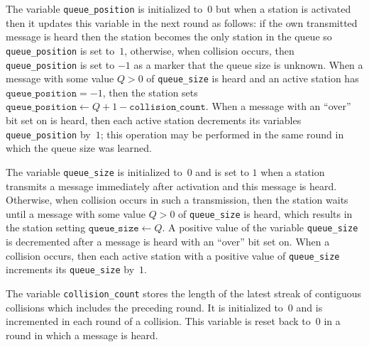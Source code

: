 \documentclass[11pt]{article}
\begin{document}
The variable \texttt{queue\_position} is initialized to~$0$ but when a station is activated then it updates this variable in the next round as follows: if the own transmitted message is heard then the station becomes the only station in the queue so \texttt{queue\_position} is set to~$1$, otherwise, when collision occurs, then \texttt{queue\_position} is set to $-1$ as a marker that the queue size is unknown.
When a message with some value $Q>0$ of \texttt{queue\_size} is heard and an active station has $\texttt{queue\_position}=-1$, then the station sets   $\texttt{queue\_position}\gets Q+1 -\texttt{collision\_count}$.
When a message with an ``over'' bit set on is heard, then each active station decrements its variables \texttt{queue\_position}  by~$1$; this operation may be performed in the same round in which the queue size was learned.


The variable \texttt{queue\_size} is initialized to~$0$ and is set to $1$ when a station transmits a message immediately after activation and this message is heard.
Otherwise, when collision occurs in such a transmission, then the station waits until a message with some value $Q>0$ of \texttt{queue\_size} is heard, which results in the station setting $\texttt{queue\_size}\gets Q$.
A positive value of the variable \texttt{queue\_size} is decremented after a message  is heard with an ``over'' bit set on.
When a collision occurs, then each active station with a positive value of \texttt{queue\_size} increments its \texttt{queue\_size} by~$1$. 

The variable \texttt{collision\_count} stores the length of the latest streak of contiguous collisions which includes the preceding round.
It is initialized to~$0$ and is incremented in each round of a collision.
This variable is reset back to~$0$ in a round in which a message is heard.
\end{document}
